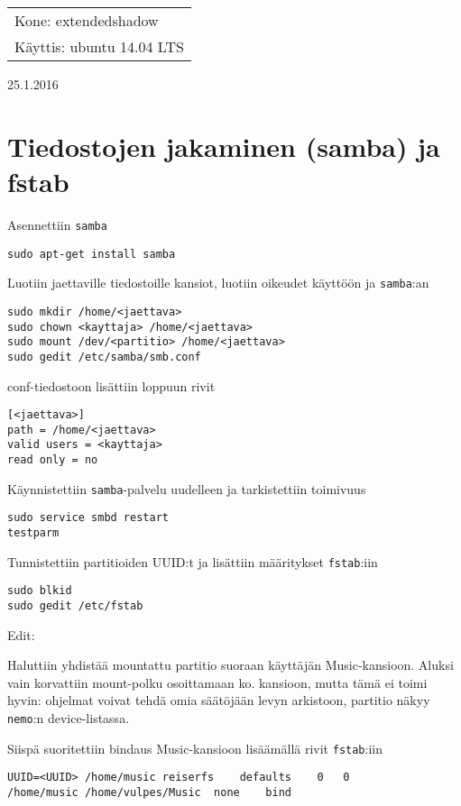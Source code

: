 \documentclass[main.tex]{subfiles}
\begin{document}
\thispagestyle{empty}
\begin{tabular}[t]{l}
Kone: extendedshadow\\
Käyttis: ubuntu 14.04 LTS
\end{tabular}
\hfill 25.1.2016

{\section{Tiedostojen jakaminen (samba) ja fstab}}

Asennettiin \texttt{samba}

\begin{lstlisting}
sudo apt-get install samba
\end{lstlisting}

Luotiin jaettaville tiedostoille kansiot, luotiin oikeudet käyttöön ja \texttt{samba}:an

\begin{lstlisting}
sudo mkdir /home/<jaettava>
sudo chown <kayttaja> /home/<jaettava>
sudo mount /dev/<partitio> /home/<jaettava>
sudo gedit /etc/samba/smb.conf
\end{lstlisting}

conf-tiedostoon lisättiin loppuun rivit

\begin{lstlisting}
[<jaettava>]
path = /home/<jaettava>
valid users = <kayttaja>
read only = no
\end{lstlisting}

Käynnistettiin \texttt{samba}-palvelu uudelleen ja tarkistettiin toimivuus

\begin{lstlisting}
sudo service smbd restart
testparm
\end{lstlisting}

Tunnistettiin partitioiden UUID:t ja lisättiin määritykset \texttt{fstab}:iin

\begin{lstlisting}
sudo blkid
sudo gedit /etc/fstab
\end{lstlisting}

Edit:

Haluttiin yhdistää mountattu partitio suoraan käyttäjän Music-kansioon. Aluksi vain korvattiin mount-polku osoittamaan ko. kansioon, mutta tämä ei toimi hyvin: ohjelmat voivat tehdä omia säätöjään levyn arkistoon, partitio näkyy \texttt{nemo}:n device-listassa.

Siispä suoritettiin bindaus Music-kansioon lisäämällä rivit \texttt{fstab}:iin

\begin{lstlisting}
UUID=<UUID>	/home/music	reiserfs	defaults	0	0
/home/music	/home/vulpes/Music	none	bind
\end{lstlisting}
\end{document}
